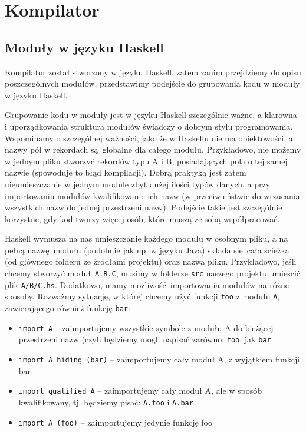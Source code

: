 \section{Kompilator}

\subsection{Moduły w języku Haskell}
Kompilator został stworzony w języku Haskell, zatem zanim przejdziemy do opisu poszczególnych modułów, przedstawimy podejście do grupowania kodu w moduły w języku Haskell.

Grupowanie kodu w moduły jest w języku Haskell szczególnie ważne, a klarowna i uporządkowania struktura modułów świadczy o dobrym stylu programowania. Wspominamy o szczególnej ważności, jako że w Haskellu nie ma obiektowości, a nazwy pól w rekordach są globalne dla całego modułu. Przykładowo, nie możemy w jednym pliku stworzyć rekordów typu A i B, posiadających pola o tej samej nazwie (spowoduje to błąd kompilacji). Dobrą praktyką jest zatem nieumieszczanie w jednym module zbyt dużej ilości typów danych, a przy importowaniu modułów kwalifikowanie ich nazw (w przeciwieństwie do wrzucania wszystkich nazw do jednej przestrzeni nazw). Podejście takie jest szczególnie korzystne, gdy kod tworzy więcej osób, które muszą ze sobą współpracować.

Haskell wymusza na nas umieszczanie każdego modułu w osobnym pliku, a na pełną nazwę modułu (podobnie jak np. w języku Java) składa się cała ścieżka (od głównego folderu ze źródłami projektu) oraz nazwa pliku. Przykładowo, jeśli chcemy stworzyć moduł \texttt{A.B.C}, musimy w folderze \texttt{src} naszego projektu umieścić plik \texttt{A/B/C.hs}. Dodatkowo, mamy możliwość importowania modułów na różne sposoby. Rozważmy sytuację, w której chcemy użyć funkcji \texttt{foo} z modułu \texttt{A}, zawierającego również funkcję \texttt{bar}:
\begin{itemize}
  \item \texttt{import A} -- zaimportujemy wszystkie symbole z modułu A do bieżącej przestrzeni nazw (czyli będziemy mogli napisać zarówno: \texttt{foo}, jak \texttt{bar}
  \item \texttt{import A hiding (bar)} -- zaimportujemy cały moduł A, z wyjątkiem funkcji bar
  \item \texttt{import qualified A} -- zaimportujemy cały moduł A, ale w sposób kwalifikowany, tj. będziemy pisać: \texttt{A.foo} i \texttt{A.bar}
  \item \texttt{import A (foo)} -- zaimportujemy jedynie funkcję foo
\end{itemize}

